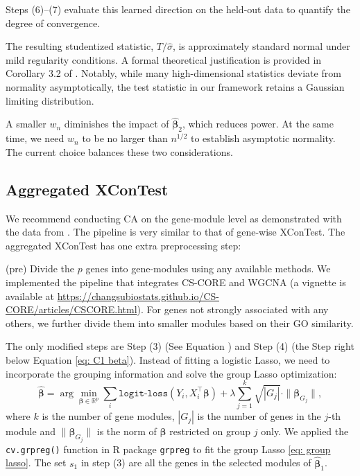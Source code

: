 \documentclass[11pt]{article}
\begin{document}
Steps (6)--(7) evaluate this learned direction on the held-out data to quantify the degree of convergence.

The resulting studentized statistic, $T / \hat{\sigma}$, is approximately standard normal under mild regularity conditions. A formal theoretical justification is provided in Corollary 3.2 of \cite{zhang2024adaptive}. Notably, while many high-dimensional statistics deviate from normality asymptotically, the test statistic in our framework retains a Gaussian limiting distribution.

A smaller $w_n$ diminishes the impact of $\widehat{\boldsymbol{\beta}}_2$, which reduces power. At the same time, we need $w_n$ to be no larger than $n^{1/2}$ to establish asymptotic normality. The current choice balances these two considerations.

\subsection*{Aggregated XConTest}

We recommend conducting CA on the gene-module level as demonstrated with the data from \cite{yao2024scalable}. The pipeline is very similar to that of gene-wise XConTest. The aggregated XConTest has one extra preprocessing step:

(pre) Divide the $p$ genes into gene-modules using any available methods. We implemented the pipeline that integrates CS-CORE and WGCNA (a vignette is available at \url{https://changsubiostats.github.io/CS-CORE/articles/CSCORE.html}). For genes not strongly associated with any others, we further divide them into smaller modules based on their GO similarity.

The only modified steps are Step (3) (See Equation ) and Step (4) (the Step right below Equation \ref{eq: C1 beta}). Instead of fitting a logistic Lasso, we need to incorporate the grouping information and solve the group Lasso optimization:
\begin{equation}\label{eq: group lasso}
   \widehat{\bm \beta} = \arg\min_{\bm{\beta}\in\mathbb{R}^p} \sum_{i} \texttt{logit-loss}(Y_i, X_i^\top \bm{\beta}) + \lambda \sum_{j=1}^k \sqrt{\left|G_j\right|} \cdot \|\bm{\beta}_{G_j}\|,
\end{equation}
where $k$ is the number of gene modules, $|G_j|$ is the number of genes in the $j$-th module and $\|\bm{\beta}_{G_j}\|$ is the norm of $\bm{\beta}$ restricted on group $j$ only. We applied the \texttt{cv.grpreg()} function in R package \texttt{grpreg} \cite{breheny2015group} to fit the group Lasso \eqref{eq: group lasso}. The set $s_1$ in step (3) are all the genes in the selected modules of $\widehat{\bm{\beta}}_1$.
\end{document}
